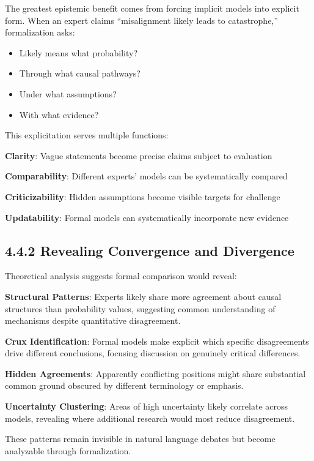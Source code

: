 \documentclass[
  11pt,
  letterpaper,
]{book}
\providecommand{\tightlist}{%
  \setlength{\itemsep}{0pt}\setlength{\parskip}{0pt}}
\begin{document}
The greatest epistemic benefit comes from forcing implicit models into
explicit form. When an expert claims ``misalignment likely leads to
catastrophe,'' formalization asks:

\begin{itemize}
\tightlist
\item
  Likely means what probability?
\item
  Through what causal pathways?
\item
  Under what assumptions?
\item
  With what evidence?
\end{itemize}

This explicitation serves multiple functions:

\textbf{Clarity}: Vague statements become precise claims subject to
evaluation

\textbf{Comparability}: Different experts' models can be systematically
compared

\textbf{Criticizability}: Hidden assumptions become visible targets for
challenge

\textbf{Updatability}: Formal models can systematically incorporate new
evidence

\subsection{4.4.2 Revealing Convergence and
Divergence}\label{sec-convergence-divergence}

Theoretical analysis suggests formal comparison would reveal:

\textbf{Structural Patterns}: Experts likely share more agreement about
causal structures than probability values, suggesting common
understanding of mechanisms despite quantitative disagreement.

\textbf{Crux Identification}: Formal models make explicit which specific
disagreements drive different conclusions, focusing discussion on
genuinely critical differences.

\textbf{Hidden Agreements}: Apparently conflicting positions might share
substantial common ground obscured by different terminology or emphasis.

\textbf{Uncertainty Clustering}: Areas of high uncertainty likely
correlate across models, revealing where additional research would most
reduce disagreement.

These patterns remain invisible in natural language debates but become
analyzable through formalization.
\end{document}
